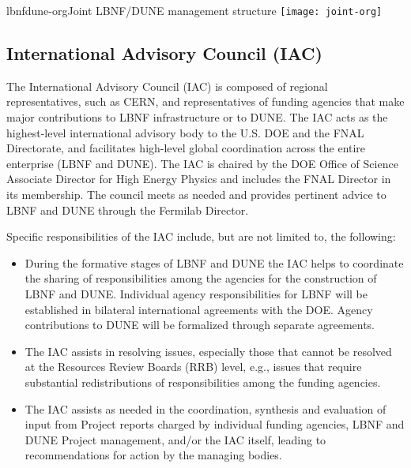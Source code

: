\begin{cdrfigure}{lbnfdune-org}{Joint LBNF/DUNE management structure}
\texttt{[image: joint-org]}
\end{cdrfigure}

\subsection{International Advisory Council (IAC) }

The International Advisory Council (IAC) is composed of
regional representatives, such as CERN, and representatives of
funding agencies that make major contributions to LBNF infrastructure or to DUNE. The IAC 
acts as the highest-level international advisory body to the U.S.
DOE and the FNAL Directorate, and facilitates
high-level global coordination across the entire enterprise (LBNF and DUNE).
The IAC is chaired by the DOE Office of Science Associate Director
for High Energy Physics and includes the FNAL Director in its membership.  
The council meets as needed and provides pertinent advice to 
LBNF and DUNE  
through the Fermilab Director.  


Specific responsibilities of the IAC include, but are not limited to,
the following:


\begin{itemize}
\item During the formative stages of LBNF and DUNE
the IAC helps to coordinate the sharing of responsibilities among
the agencies for the construction of LBNF and DUNE.
Individual agency responsibilities for LBNF will be established in
bilateral international agreements with the DOE. Agency contributions to
DUNE will be formalized through separate agreements.

\item The IAC assists in resolving issues, especially those
that cannot be resolved at the Resources Review Boards (RRB) level,
e.g., issues that require substantial redistributions of
responsibilities among the funding agencies.

\item The IAC assists as needed in the coordination,
synthesis and evaluation of input from Project reports charged by
individual funding agencies, LBNF and DUNE Project management,
and/or the IAC itself, leading to recommendations for action by
the managing bodies.
\end{itemize}

